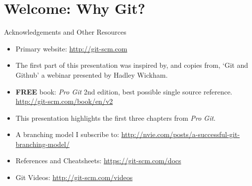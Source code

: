   \section{Welcome: Why Git?}
  \begin{frame}[t]{Acknowledgements and Other Resources}

    \begin{itemize}

      \item Primary website: \url{http://git-scm.com}

      \item The first part of this presentation was inspired by, and copies
        from, `Git and Github' a webinar presented by Hadley Wickham.

      \item {\bf FREE} book: {\it Pro Git} 2nd
        edition, best possible single source
        reference. \url{http://git-scm.com/book/en/v2}

      \item This presentation highlights the first three chapters from
        {\it Pro Git}.

      \item A branching model I subscribe to:
        \url{http://nvie.com/posts/a-successful-git-branching-model/}

      \item References and Cheatsheets:
        \url{https://git-scm.com/docs}

      \item Git Videos: \url{http://git-scm.com/videos}

    \end{itemize} 
  \end{frame}

